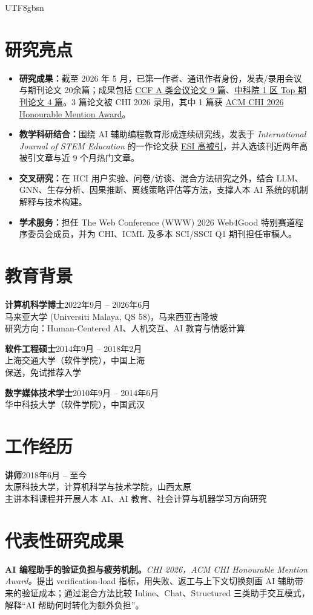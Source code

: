 \documentclass[a4paper,10pt]{article}
\newcommand{\cvlabel}[1]{\textbf{#1}}
\newcommand{\entry}[4]{\textbf{#1}\hfill #2\\#3\\\textcolor{cvgray}{#4}\vspace{0.15em}}
\begin{document}
\begin{CJK*}{UTF8}{gbsn}
\section*{研究亮点}
\begin{itemize}
  \item \cvlabel{研究成果：}截至 2026 年 5 月，已第一作者、通讯作者身份，发表/录用会议与期刊论文 20余篇；成果包括 \underline{CCF A 类会议论文 9 篇}、\underline{中科院 1 区 Top 期刊论文 4 篇}。3 篇论文被 CHI 2026 录用，其中 1 篇获 \underline{ACM CHI 2026 Honourable Mention Award}。
  \item \cvlabel{教学科研结合：}围绕 AI 辅助编程教育形成连续研究线，发表于 \textit{International Journal of STEM Education} 的一作论文获 \underline{ESI 高被引}，并入选该刊近两年高被引文章与近 9 个月热门文章。
  \item \cvlabel{交叉研究：}在 HCI 用户实验、问卷/访谈、混合方法研究之外，结合 LLM、GNN、生存分析、因果推断、离线策略评估等方法，支撑人本 AI 系统的机制解释与技术构建。
  \item \cvlabel{学术服务：}担任 The Web Conference (WWW) 2026 Web4Good 特别赛道程序委员会成员，并为 CHI、ICML 及多本 SCI/SSCI Q1 期刊担任审稿人。
\end{itemize}

\section*{教育背景}

\entry{计算机科学博士}{2022年9月 -- 2026年6月}{马来亚大学 (Universiti Malaya, QS 58)，马来西亚吉隆坡}{研究方向：Human-Centered AI、人机交互、AI 教育与情感计算}

\entry{软件工程硕士}{2014年9月 -- 2018年2月}{上海交通大学（软件学院），中国上海}{保送，免试推荐入学}

\entry{数字媒体技术学士}{2010年9月 -- 2014年6月}{华中科技大学（软件学院），中国武汉}{}

\section*{工作经历}

\entry{讲师}{2018年6月 -- 至今}{太原科技大学，计算机科学与技术学院，山西太原}{主讲本科课程并开展人本 AI、AI 教育、社会计算与机器学习方向研究}

\section*{代表性研究成果}
\begin{enumerate}[label=\textbf{[S\arabic*]}]
  \item \cvlabel{AI 编程助手的验证负担与疲劳机制。}\textit{CHI 2026，ACM CHI Honourable Mention Award。}提出 verification-load 指标，用失败、返工与上下文切换刻画 AI 辅助带来的验证成本；通过混合方法比较 Inline、Chat、Structured 三类助手交互模式，解释“AI 帮助何时转化为额外负担”。


\end{enumerate}
\end{CJK*}
\end{document}
